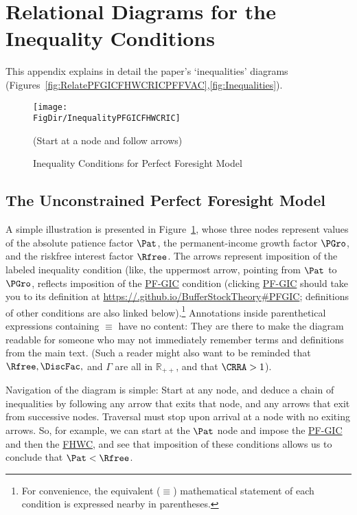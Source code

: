 \documentclass[\econtexRoot/BufferStockTheory]{subfiles}
\newcommand{\BSTlinkTo}{https://\owner.github.io/BufferStockTheory}
\renewcommand{\FHWC}{\href{{\BSTlinkTo}FHWC}{\textrm{FHWC}}}
\newcommand{\PFGICFull}{\href{{\BSTlinkTo}\#PFGIC}{{\BSTlinkTo}\#PFGIC}}
\renewcommand{\FHWC}{\href{{\BSTlinkTo}\#FHWC}{\textrm{FHWC}}}
\renewcommand{\PFGIC}{\href{{\BSTlinkTo}\#PFGIC}{\textrm{PF-GIC}}}
\begin{document}
\hypertarget{ApndxConditionDiagrams}{}

\section{Relational Diagrams for the Inequality Conditions}
\label{sec:ApndxConditionDiagrams}

This appendix explains in detail the paper's `inequalities' diagrams (Figures~\ref{fig:RelatePFGICFHWCRICPFFVAC},\ref{fig:Inequalities}).

\hypertarget{InequalityPFGICFHWCRIC}{}
\begin{figure}
\centering
\texttt{[image: \\FigDir/InequalityPFGICFHWCRIC]}
\caption{Inequality Conditions for Perfect Foresight Model}
\centerline{ (Start at a node and follow arrows)}
\label{fig:InequalityPFGICFHWCRIC}
\end{figure}

\subsection{The Unconstrained Perfect Foresight Model}

A simple illustration is presented in Figure~\ref{fig:InequalityPFGICFHWCRIC}, whose three nodes represent values of the absolute patience factor $\Pat$, the permanent-income growth factor $\PGro$, and the riskfree interest factor $\Rfree$.  The arrows represent imposition of the labeled inequality condition  (like,  the uppermost arrow, pointing from {$\Pat$} to $\PGro$, reflects imposition of the {\PFGIC} condition (clicking {\PFGIC} should take you to its definition at {\PFGICFull}; definitions of other conditions are also linked below).\footnote{For convenience, the equivalent ($\equiv$) mathematical statement of each condition is expressed nearby in parentheses.}  Annotations inside parenthetical expressions containing $\equiv$ have no content: They are there to make the diagram readable for someone who may not immediately remember terms and definitions from the main text.  (Such a reader might also want to be reminded that $\Rfree, \DiscFac, $ and $\Gamma$ are all in $\mathbb{R}_{++}$, and that $\CRRA>1$).

Navigation of the diagram is simple: Start at any node, and deduce a chain of inequalities by following any arrow that exits that node, and any arrows that exit from successive nodes.  Traversal must stop upon arrival at a node with no exiting arrows.  So, for example, we can start at the $\Pat$ node and impose the {\PFGIC} and then the {\FHWC}, and see that imposition of these conditions allows us to conclude that $\Pat < \Rfree$.
\end{document}

